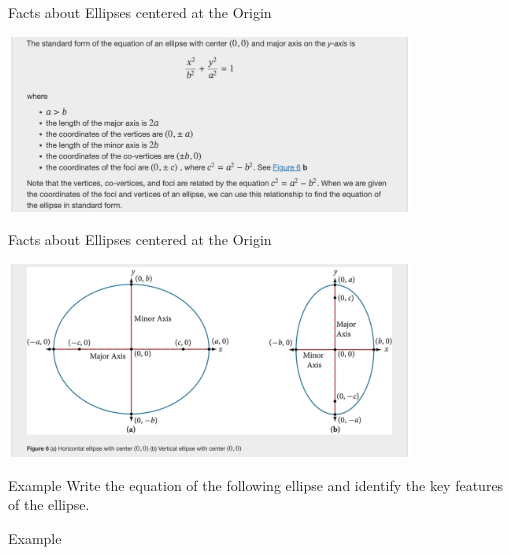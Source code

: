 \documentclass[presentation]{beamer}
\begin{document}
\begin{frame}[label={sec:orgb8619f9}]{Facts about Ellipses centered at the Origin}
\begin{center}
\includegraphics[width=0.8\textwidth]{./ell02.png}
\end{center}
\end{frame}

\begin{frame}[label={sec:org5a8991b}]{Facts about Ellipses centered at the Origin}
\begin{center}
\includegraphics[width=0.8\textwidth]{./ell03.png}
\end{center}
\end{frame}

\begin{frame}[label={sec:org271777c}]{Example}
Write the equation of the following ellipse and identify the key features of the ellipse.

\end{frame}

\begin{frame}[label={sec:orge54e7f7}]{Example}
\end{frame}
\end{document}
